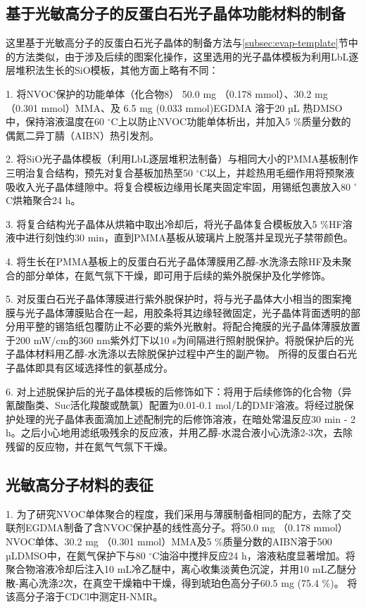 \subsection{基于光敏高分子的反蛋白石光子晶体功能材料的制备}
这里基于光敏高分子的反蛋白石光子晶体的制备方法与\ref{subsec:evap-template}节中的方法类似，由于涉及后续的图案化操作，这里选用的光子晶体模板为利用LbL逐层堆积法生长的SiO模板，其他方面上略有不同：

1. 将NVOC保护的功能单体（化合物8） 50.0 mg （0.178 mmol）、30.2 mg （0.301 mmol）MMA、及 6.5 mg (0.033 mmol)EGDMA 溶于20 µL 热DMSO中，保持溶液温度在60 $^{\circ}$C上以防止NVOC功能单体析出，并加入5 \%质量分数的偶氮二异丁腈（AIBN）热引发剂。

2. 将SiO光子晶体模板（利用LbL逐层堆积法制备）与相同大小的PMMA基板制作三明治复合结构，预先对复合基板加热至50 $^{\circ}$C以上，并趁热用毛细作用将预聚液吸收入光子晶体缝隙中。将复合模板边缘用长尾夹固定牢固，用锡纸包裹放入80 $^{\circ}$C烘箱聚合24 h。

3. 将复合结构光子晶体从烘箱中取出冷却后，将光子晶体复合模板放入5 \%HF溶液中进行刻蚀约30 min，直到PMMA基板从玻璃片上脱落并呈现光子禁带颜色。

4. 将生长在PMMA基板上的反蛋白石光子晶体薄膜用乙醇-水洗涤去除HF及未聚合的部分单体，在氮气氛下干燥，即可用于后续的紫外脱保护及化学修饰。

5. 对反蛋白石光子晶体薄膜进行紫外脱保护时，将与光子晶体大小相当的图案掩膜与光子晶体薄膜贴合在一起，用胶条将其边缘轻微固定，光子晶体背面透明的部分用平整的锡箔纸包覆防止不必要的紫外光散射。将配合掩膜的光子晶体薄膜放置于200 mW/cm的360 nm紫外灯下以10 s为间隔进行照射脱保护。将脱保护后的光子晶体材料用乙醇-水洗涤以去除脱保护过程中产生的副产物。
所得的反蛋白石光子晶体即具有区域选择性的氨基成分。

6. 对上述脱保护后的光子晶体模板的后修饰如下：将用于后续修饰的化合物（异氰酸酯类、Suc活化羧酸或酰氯）配置为0.01-0.1 mol/L的DMF溶液。将经过脱保护处理的光子晶体表面滴加上述配制完的后修饰溶液，在暗处常温反应30 min - 2 h。之后小心地用滤纸吸残余的反应液，并用乙醇-水混合液小心洗涤2-3次，去除残留的反应物，并在氮气气氛下干燥。

\subsection{光敏高分子材料的表征}

1. 为了研究NVOC单体聚合的程度，我们采用与薄膜制备相同的配方，去除了交联剂EGDMA制备了含NVOC保护基的线性高分子。将50.0 mg （0.178 mmol）NVOC单体、30.2 mg （0.301 mmol）MMA及5 \%质量分数的AIBN溶于500 µLDMSO中，在氮气保护下与80 $^{\circ}$C油浴中搅拌反应24 h，溶液粘度显著增加。将聚合物溶液冷却后注入10 mL冷乙醚中，离心收集淡黄色沉淀，并用10 mL乙醚分散-离心洗涤2次，在真空干燥箱中干燥，得到琥珀色高分子60.5 mg (75.4 \%)。
将该高分子溶于CDCl中测定H-NMR。


